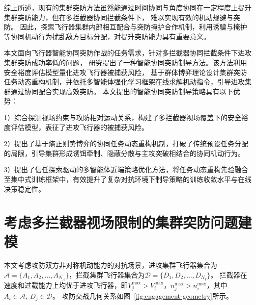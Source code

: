综上所述，现有的集群突防方法虽然能通过时间协同与角度协同在一定程度上提升集群突防能力，但在多拦截器协同拦截条件下，
难以实现有效的机动规避与突防。
因此，探索飞行器集群内部相互配合与突防掩护合作机制，利用诱骗与掩护等协同机动行为扰乱敌方目标分配，对提升突防能力具有重要意义。

本文面向飞行器智能协同突防作战的任务需求，针对多拦截器协同拦截条件下进攻集群突防成功率低的问题，
研究提出了一种智能协同突防制导方法。该方法利用安全裕度评估模型量化进攻飞行器被捕获风险，
基于群体博弈理论设计集群突防任务动态重构机制，并依托多智能体强化学习框架在线求解机动指令，引导进攻集群通过协同配合实现高效突防。
本文提出的智能协同突防制导策略具有以下优势：





1）综合探测视场约束与攻防相对运动关系，构建了多拦截器视场覆盖下的安全裕度评估模型，表征了进攻飞行器的被捕获风险。

2）提出了基于熵正则势博弈的协同任务动态重构机制，打破了传统预设任务分配的局限，引导集群形成诱饵牵制、隐蔽分散与主攻突破相结合的协同机动行为。

3）提出了信任探索驱动的多智能体近端策略优化方法，将任务动态重构先验融合至集中式训练框架中，有效提升了复杂对抗环境下制导策略的训练收敛水平与在线决策稳定性。

\section{考虑多拦截器视场限制的集群突防问题建模} 
\label{sec:aircraft-model}


本文考虑攻防双方非对称机动能力的对抗场景，进攻集群飞行器集合为$\mathcal{A}=\{A_1,A_2,\dots,A_{N_A}\}$，拦截集群飞行器集合为$\mathcal{D}=\{D_1,D_2,\dots,D_{N_I}\}$。
拦截器在速度和过载能力上均优于进攻飞行器，即$V_j^{\max}>V_i^{\max}$，$n_j^{\max}>n_i^{\max}$，其中$A_i\in\mathcal A,\ D_j\in\mathcal D $。
攻防交战几何关系如图~\ref{fig:engagement-geometry}所示。

